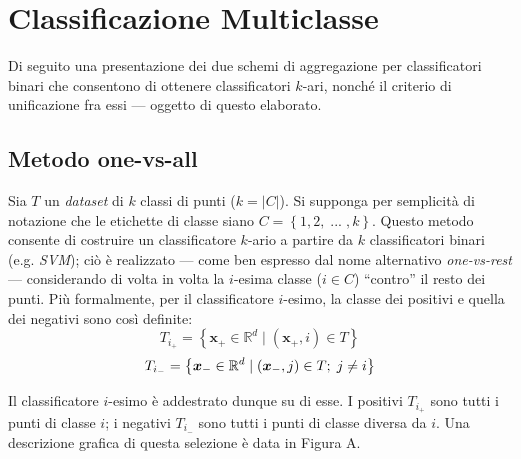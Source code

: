 %

\chapter{Classificazione Multiclasse}
Di seguito una presentazione dei due schemi di aggregazione per classificatori binari che consentono di ottenere classificatori $k$-ari, nonché il criterio di unificazione fra essi --- oggetto di questo elaborato.

\section{Metodo one-vs-all}
Sia $T$ un \textit{dataset} di $k$ classi di punti ($k = |C|$). Si supponga per semplicità di notazione che le etichette di classe siano $C = \left\{ 1, 2, \; ... \;, k \right\}$. Questo metodo consente di costruire un classificatore $k$-ario a partire da $k$ classificatori binari (e.g. \textit{SVM}); ciò è realizzato --- come ben espresso dal nome alternativo \textit{one-vs-rest} --- considerando di volta in volta la $i$-esima classe ($i \in C$) ``contro'' il resto dei punti.
Più formalmente, per il classificatore $i$-esimo, la classe dei positivi e quella dei negativi sono così definite:
\begin{equation}
	T_{i_+} = \left\{ \boldsymbol{x}_+ \in \mathbb{R}^d \;|\; (\boldsymbol{x}_+, i) \in T \right\}	
\end{equation}
\begin{equation}
	T_{i_-} = \left\{ \boldsymbol{x}_- \in \mathbb{R}^d \;|\; (\boldsymbol{x}_-, j) \in T ;\; j \neq i \right\}		
\vspace{2mm}
\end{equation}

Il classificatore $i$-esimo è addestrato dunque su di esse.
I positivi $T_{i_+}$ sono tutti i punti di classe $i$; i negativi $T_{i_-}$ sono tutti i punti di classe diversa da $i$.
Una descrizione grafica di questa selezione è data in Figura A.

